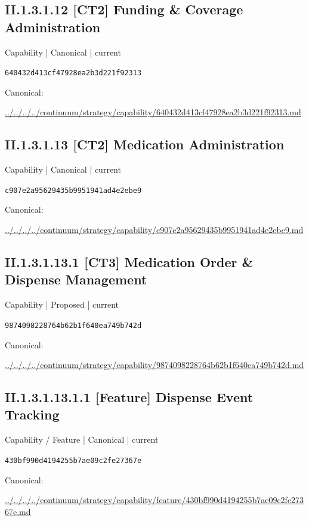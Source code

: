 \documentclass[10pt,a4paper]{article}
\begin{document}
\subsection*{II.1.3.1.12 [CT2] Funding \& Coverage Administration}
{\small Capability | Canonical | current}\par
\texttt{640432d413cf47928ea2b3d221f92313}\par
Canonical: \par
{\footnotesize\url{../../../../continuum/strategy/capability/640432d413cf47928ea2b3d221f92313.md}}\par
\subsection*{II.1.3.1.13 [CT2] Medication Administration}
{\small Capability | Canonical | current}\par
\texttt{c907e2a95629435b9951941ad4e2ebe9}\par
Canonical: \par
{\footnotesize\url{../../../../continuum/strategy/capability/c907e2a95629435b9951941ad4e2ebe9.md}}\par
\subsection*{II.1.3.1.13.1 [CT3] Medication Order \& Dispense Management}
{\small Capability | Proposed | current}\par
\texttt{9874098228764b62b1f640ea749b742d}\par
Canonical: \par
{\footnotesize\url{../../../../continuum/strategy/capability/9874098228764b62b1f640ea749b742d.md}}\par
\subsection*{II.1.3.1.13.1.1 [Feature] Dispense Event Tracking}
{\small Capability / Feature | Canonical | current}\par
\texttt{430bf990d4194255b7ae09c2fe27367e}\par
Canonical: \par
{\footnotesize\url{../../../../continuum/strategy/capability/feature/430bf990d4194255b7ae09c2fe27367e.md}}\par
\end{document}
